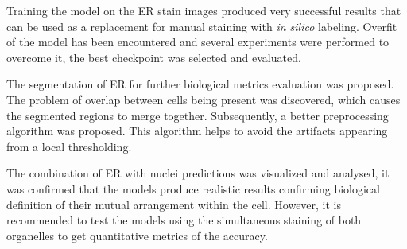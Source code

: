 Training the model on the ER stain images produced very successful results that can be used as a replacement for manual staining with \textit{in silico} labeling. Overfit of the model has been encountered and several experiments were performed to overcome it, the best checkpoint was selected and evaluated.

The segmentation of ER for further biological metrics evaluation was proposed. The problem of overlap between cells being present was discovered, which causes the segmented regions to merge together. Subsequently, a better preprocessing algorithm was proposed. This algorithm helps to avoid the artifacts appearing from a local thresholding.

The combination of ER with nuclei predictions was visualized and analysed, it was confirmed that the models produce realistic results confirming biological definition of their mutual arrangement within the cell. However, it is recommended to test the models using the simultaneous staining of both organelles to get quantitative metrics of the accuracy.